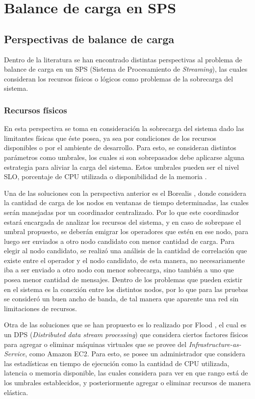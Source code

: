 \chapter{Balance de carga en SPS}
\label{cap:estadoDelArte}

\section{Perspectivas de balance de carga}
\label{sec:perspectivasBC}
Dentro de la literatura se han encontrado distintas perspectivas al problema de balance de carga en un SPS (Sistema de Procesamiento de \textsl{Streaming}), las cuales consideran los recursos físicos o lógicos como problemas de la sobrecarga del sistema.

\subsection{Recursos físicos}
\label{subsec:recFisicosBC}
En esta perspectiva se toma en consideración la sobrecarga del sistema dado las limitantes físicas que éste posea, ya sea por condiciones de los recursos disponibles o por el ambiente de desarrollo. Para esto, se consideran distintos parámetros como umbrales, los cuales si son sobrepasados debe aplicarse alguna estrategia para aliviar la carga del sistema. Estos umbrales pueden ser el nivel SLO, porcentaje de CPU utilizada o disponibilidad de la memoria \citep{Dong06schedulingalgorithms}.

Una de las soluciones con la perspectiva anterior es el Borealis \citep{XingZH05}, donde considera la cantidad de carga de los nodos en ventanas de tiempo determinadas, las cuales serán manejadas por un coordinador centralizado. Por lo que este coordinador estará encargada de analizar los recursos del sistema, y en caso de sobrepase el umbral propuesto, se deberán emigrar los operadores que estén en ese nodo, para luego ser enviados a otro nodo candidato con menor cantidad de carga. Para elegir al nodo candidato, se realizó una análisis de la cantidad de correlación que existe entre el operador y el nodo candidato, de esta manera, no necesariamente iba a ser enviado a otro nodo con menor sobrecarga, sino también a uno que posea menor cantidad de mensajes. Dentro de los problemas que pueden existir en el sistema es la conexión entre los distintos nodos, por lo que para las pruebas se consideró un buen ancho de banda, de tal manera que aparente una red sin limitaciones de recursos.

Otra de las soluciones que se han propuesto es lo realizado por Flood \citep{Alves2010flood}, el cual es un DPS (\textit{Distributed data stream processing}) que considera ciertos factores físicos para agregar o eliminar máquinas virtuales que se provee del \textit{Infrastructure-as-Service}, como Amazon EC2. Para esto, se posee un administrador que considera las estadísticas en tiempo de ejecución como la cantidad de CPU utilizada, latencia o memoria disponible, las cuales considera para ver en que rango está de los umbrales establecidos, y posteriormente agregar o eliminar recursos de manera elástica.


